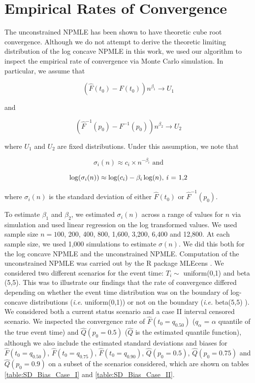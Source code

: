 	{\section{Empirical Rates of Convergence} 
	\label{sec:Conv}	}
	The unconstrained NPMLE has been shown to have theoretic cube root convergence. Although we do not attempt to derive the theoretic limiting distribution of the log concave NPMLE in this work, we used our algorithm to inspect the empirical rate of convergence via Monte Carlo simulation. In particular, we assume that
	
	\[ ( \hat F (t_0) - F(t_0) ) n^{\beta_1} \rightarrow U_1 \]
	
	and
	
	\[ (\hat F^{-1}(p_0) - F^{-1}(p_0) ) n^{\beta_2} \rightarrow U_2 \]
		
	where $U_1$ and $U_2$ are fixed distributions. Under this assumption, we note that 
	
	\[ \sigma_i (n) \approx c_i \times n^{-\beta_i} \text{ and}	\]
		
	\[ \log( \sigma_i (n) ) \approx \log(c_i) - \beta_i \log(n) \text{, \emph{i} = 1,2} \]	
		
	where $\sigma_i(n)$ is the standard deviation of either $\hat F(t_0)$ or $\hat F^{-1}(p_0)$. 	
	
	To estimate $\beta_1$ and $\beta_2$, we estimated $\sigma_i(n)$ across a range of values for $n$ via simulation and used linear regression on the log transformed values. We used sample size $n = 100$, 200, 400, 800, 1,600, 3,200, 6,400 and 12,800. At each sample size, we used 1,000 simulations to estimate $\sigma(n)$.  We did this both for the log concave NPMLE and the unconstrained NPMLE. Computation of the unconstrained NPMLE was carried out by the R package MLEcens \cite{R_MLEcens}. We considered two different scenarios for the event time: $T_i \sim $ uniform(0,1) and beta (5,5). This was to illustrate our findings that the rate of convergence differed depending on whether the event time distribution was on the boundary of log-concave distributions (\emph{i.e.} uniform(0,1)) or not on the boundary (\emph{i.e.} beta(5,5) ). We considered both a current status scenario and a case II interval censored scenario. We inspected the convergence rate of $\hat F(t_0 = q_{0.50})$ ($q_\alpha$ = $\alpha$ quantile of the true event time) and $\hat Q( p_0 = 0.5)$ ($\hat Q$ is the estimated quantile function), although we also include the estimated standard deviations and biases for $\hat F(t_0 = q_{0.50} )$, $\hat F(t_0 = q_{0.75} )$, $\hat F(t_0 = q_{0.90} )$, $\hat Q(p_0 =0.5 )$, $\hat Q(p_0 =0.75 )$ and $\hat Q(p_0 =0.9 )$ on a subset of the scenarios considered, which are shown on tables \ref{table:SD_Bias_Case_I} and \ref{table:SD_Bias_Case_II}. 

